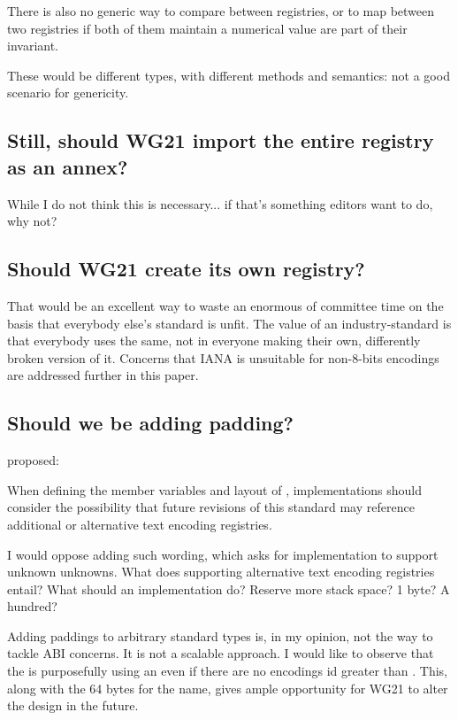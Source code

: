 \documentclass{wg21}
\begin{document}
There is also no generic way to compare between registries, or to map between two registries if both of them maintain a numerical value are part of their invariant.

These would be different types, with different methods and semantics: not a good scenario for genericity.

\subsection{Still, should WG21 import the entire registry as an annex?}

While I do not think this is necessary... if that's something editors want to do, why not?

\subsection{Should WG21 create its own registry?}

That would be an excellent way to waste an enormous of committee time on the basis that everybody else's standard is unfit.
The value of an industry-standard is that everybody uses the same, not in everyone making their own, differently broken version of it.
Concerns that IANA is unsuitable for non-8-bits encodings are addressed further in this paper.

\subsection{Should we be adding padding?}

 proposed:

\begin{quoteblock}
    When defining the member variables and layout of , implementations should consider the possibility that future revisions of this standard may reference additional or alternative text encoding registries.
\end{quoteblock}

I would oppose adding such wording, which asks for implementation to support unknown unknowns.
What does supporting alternative text encoding registries entail? What should an implementation do? Reserve more stack space? 1 byte? A hundred?

Adding paddings to arbitrary standard types is, in my opinion, not the way to tackle ABI concerns. It is not a scalable approach.
I would like to observe that the  is purposefully using an  even if there are no encodings id greater than . This, along with the 64 bytes for the name, gives ample opportunity for WG21 to alter the design in the future.
\end{document}
